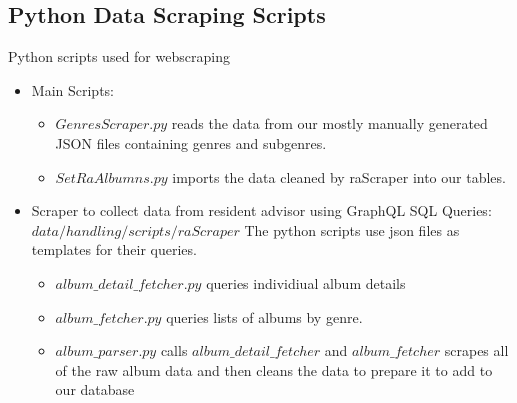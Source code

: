 \documentclass{article}
\begin{document}
\begin{itemize}
\begin{itemize}
				\end{itemize}
    \end{itemize}

    \subsection{Python Data Scraping Scripts} Python scripts used for webscraping
    \begin{itemize}
        \item Main Scripts:
        \begin{itemize}
            \item $GenresScraper.py$ reads the data from our mostly manually generated JSON files containing genres and subgenres.
            \item $SetRaAlbumns.py$ imports the data cleaned by raScraper into our tables.
        \end{itemize}
        \item Scraper to collect data from resident advisor using GraphQL SQL Queries: $data/handling/scripts/raScraper$
        The python scripts use json files as templates for their queries.
        \begin{itemize}
            \item $album\_detail\_fetcher.py$ queries individiual album details
            \item $album\_fetcher.py$ queries lists of albums by genre.
            \item $album\_parser.py$ calls $album\_detail\_fetcher$ and $album\_fetcher$ scrapes all of the raw album data and then cleans the data to prepare it to add to our database
        \end{itemize}
    \end{itemize}
\end{document}
